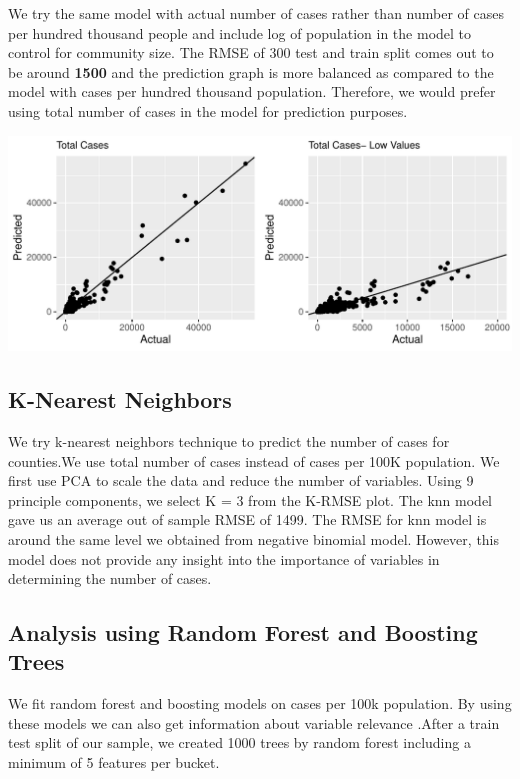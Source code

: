 \documentclass[
]{article}
\begin{document}
We try the same model with actual number of cases rather than number of
cases per hundred thousand people and include log of population in the
model to control for community size. The RMSE of 300 test and train
split comes out to be around \textbf{1500} and the prediction graph is
more balanced as compared to the model with cases per hundred thousand
population. Therefore, we would prefer using total number of cases in
the model for prediction purposes.

\includegraphics{Final-Project-Covid-19_files/figure-latex/unnamed-chunk-11-1.pdf}

\hypertarget{k-nearest-neighbors}{%
\subsection{K-Nearest Neighbors}\label{k-nearest-neighbors}}

We try k-nearest neighbors technique to predict the number of cases for
counties.We use total number of cases instead of cases per 100K
population. We first use PCA to scale the data and reduce the number of
variables. Using 9 principle components, we select K = 3 from the K-RMSE
plot. The knn model gave us an average out of sample RMSE of 1499. The
RMSE for knn model is around the same level we obtained from negative
binomial model. However, this model does not provide any insight into
the importance of variables in determining the number of cases.

\hypertarget{analysis-using-random-forest-and-boosting-trees}{%
\subsection{Analysis using Random Forest and Boosting
Trees}\label{analysis-using-random-forest-and-boosting-trees}}

We fit random forest and boosting models on cases per 100k population.
By using these models we can also get information about variable
relevance .After a train test split of our sample, we created 1000 trees
by random forest including a minimum of 5 features per bucket.
\end{document}

